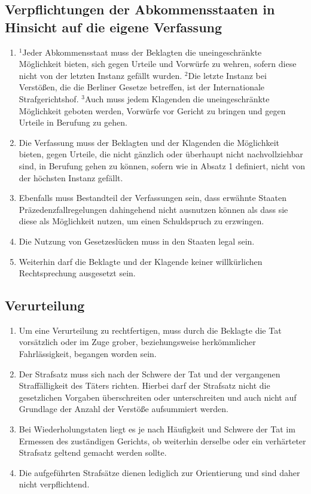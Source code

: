 \documentclass{article}
\begin{document}
\subsection{Verpflichtungen der Abkommensstaaten in Hinsicht auf die eigene Verfassung}
\begin{enumerate}[(1)]
    \item ${^1}$Jeder Abkommensstaat muss der Beklagten die uneingeschränkte Möglichkeit bieten, sich gegen Urteile und Vorwürfe zu wehren, sofern diese nicht von der letzten Instanz gefällt wurden. ${^2}$Die letzte Instanz bei Verstößen, die die Berliner Gesetze betreffen, ist der Internationale Strafgerichtshof. ${^3}$Auch muss jedem Klagenden die uneingeschränkte Möglichkeit geboten werden, Vorwürfe vor Gericht zu bringen und gegen Urteile in Berufung zu gehen.
    \item Die Verfassung muss der Beklagten und der Klagenden die Möglichkeit bieten, gegen Urteile, die nicht gänzlich oder überhaupt nicht nachvollziehbar sind, in Berufung gehen zu können, sofern wie in Absatz 1 definiert, nicht von der höchsten Instanz gefällt.
    \item Ebenfalls muss Bestandteil der Verfassungen sein, dass erwähnte Staaten Präzedenzfallregelungen dahingehend nicht ausnutzen können als dass sie diese als Möglichkeit nutzen, um einen Schuldspruch zu erzwingen.
    \item Die Nutzung von Gesetzeslücken muss in den Staaten legal sein.
    \item Weiterhin darf die Beklagte und der Klagende keiner willkürlichen Rechtsprechung ausgesetzt sein.
\end{enumerate}

\subsection{Verurteilung}
\begin{enumerate}[(1)]
    \item Um eine Verurteilung zu rechtfertigen, muss durch die Beklagte die Tat vorsätzlich oder im Zuge grober, beziehungsweise herkömmlicher Fahrlässigkeit, begangen worden sein.
    \item Der Strafsatz muss sich nach der Schwere der Tat und der vergangenen Straffälligkeit des Täters richten. Hierbei darf der Strafsatz nicht die gesetzlichen Vorgaben überschreiten oder unterschreiten und auch nicht auf Grundlage der Anzahl der Verstöße aufsummiert werden.
    \item Bei Wiederholungstaten liegt es je nach Häufigkeit und Schwere der Tat im Ermessen des zuständigen Gerichts, ob weiterhin derselbe oder ein verhärteter Strafsatz geltend gemacht werden sollte.
    \item Die aufgeführten Strafsätze dienen lediglich zur Orientierung und sind daher nicht verpflichtend.
\end{enumerate}
\end{document}
